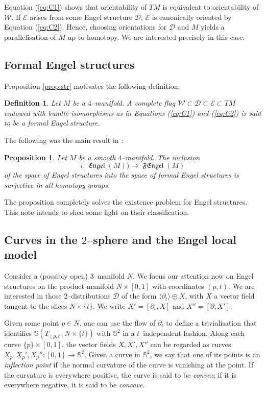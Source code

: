 \documentclass[10pt]{amsart}
\newcommand{\SE}{{\mathcal{E}}}
\newcommand{\SD}{{\mathcal{D}}}
\newcommand{\SW}{{\mathcal{W}}}
\newcommand{\Engel}{\operatorname{\mathfrak{Engel}}}
\newcommand{\FEngel}{\operatorname{\mathfrak{FEngel}}}
\newcommand{\NS}{{\mathbb{S}}}
\newtheorem{proposition}{Proposition}
\newtheorem{definition}{Definition}
\theoremstyle{definition}
\begin{document}
Equation (\ref{eq:C1}) shows that orientability of $TM$ is equivalent to orientability of $\SW$. If $\SE$ arises from some Engel structure $\SD$, $\SE$ is canonically oriented by Equation (\ref{eq:C2}). Hence, choosing orientations for $\SD$ and $M$ yields a parallelisation of $M$ up to homotopy. We are interested precisely in this case. 



\subsection{Formal Engel structures}

Proposition \ref{prop:str} motivates the following definition:
\begin{definition}
Let $M$ be a $4$--manifold. A complete flag $\SW \subset \SD \subset \SE \subset TM$ endowed with bundle isomorphisms as in Equations (\ref{eq:C1}) and (\ref{eq:C2}) is said to be a \emph{formal Engel structure}.
\end{definition}

The following was the main result in \cite{CPPP}:
\begin{proposition}
Let $M$ be a smooth $4$--manifold. The inclusion
\[ i: \Engel(M)) \to \FEngel(M) \]
of the space of Engel structures into the space of formal Engel structures is surjective in all homotopy groups.
\end{proposition}
The proposition completely solves the existence problem for Engel structures. This note intends to shed some light on their classification.

\subsection{Curves in the $2$--sphere and the Engel local model} \label{ssec:key}

Consider a (possibly open) $3$--manifold $N$. We focus our attention now on Engel structures on the product manifold $N \times [0,1]$ with coordinates $(p,t)$. We are interested in those $2$--distributions $\SD$ of the form $\langle \partial_t \rangle \oplus X$, with $X$ a vector field tangent to the slices $N \times \{t\}$. We write $X' = [\partial_t,X]$ and $X'' = [\partial,X']$.

Given some point $p \in N$, one can use the flow of $\partial_t$ to define a trivialisation that identifies $\NS(T_{(p,t)}N \times \{t\})$ with $\NS^2$ in a $t$--independent fashion. Along each curve $\{p\} \times [0,1]$, the vector fields $X,X',X''$ can be regarded as curves $X_p,X_p',X_p'': [0,1] \to \NS^2$. Given a curve in $\NS^2$, we say that one of its points is an \textsl{inflection point} if the normal curvature of the curve is vanishing at the point. If the curvature is everywhere positive, the curve is said to be \emph{convex}; if it is everywhere negative, it is said to be \emph{concave}.
\end{document}
